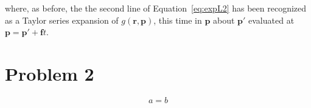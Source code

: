 \documentclass[paper=a4, fontsize=11pt]{scrartcl} %
\numberwithin{equation}{section} %
\numberwithin{figure}{section} %
\numberwithin{table}{section} %
\begin{document}
where, as before, the the second line of Equation~\ref{eq:expL2} has been recognized as a Taylor series expansion of $g(\mathbf{r}, \mathbf{p})$, this time in $\mathbf{p}$ about $\mathbf{p'}$ evaluated at $\mathbf{p} = \mathbf{p'} + \mathbf{f} t$.









\section{Problem 2}
\begin{equation}
    a = b
\end{equation}




% 

\end{document}
